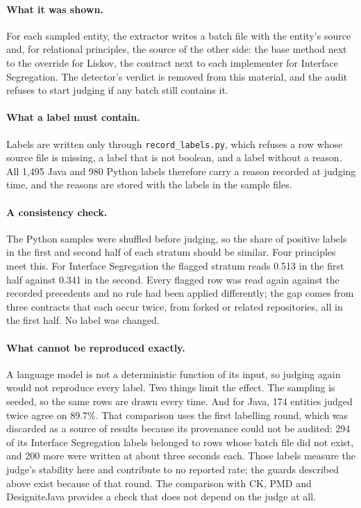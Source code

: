 \paragraph{What it was shown.} For each sampled entity, the extractor writes a batch file with the
entity's source and, for relational principles, the source of the other side: the base method next
to the override for Liskov, the contract next to each implementer for Interface Segregation. The
detector's verdict is removed from this material, and the audit refuses to start judging if any batch
still contains it.

\paragraph{What a label must contain.} Labels are written only through \texttt{record\_labels.py},
which refuses a row whose source file is missing, a label that is not boolean, and a label without a
reason. All 1{,}495 Java and 980 Python labels therefore carry a reason recorded at judging time, and
the reasons are stored with the labels in the sample files.

\paragraph{A consistency check.} The Python samples were shuffled before judging, so the share of
positive labels in the first and second half of each stratum should be similar. Four principles meet
this. For Interface Segregation the flagged stratum reads 0.513 in the first half against 0.341 in the
second. Every flagged row was read again against the recorded precedents and no rule had been applied
differently; the gap comes from three contracts that each occur twice, from forked or related
repositories, all in the first half. No label was changed.

\paragraph{What cannot be reproduced exactly.} A language model is not a deterministic function of
its input, so judging again would not reproduce every label. Two things limit the effect. The
sampling is seeded, so the same rows are drawn every time. And for Java, 174 entities judged twice
agree on 89.7\%. That comparison uses
the first labelling round, which was discarded as a source of results because its provenance could
not be audited: 294 of its Interface Segregation labels belonged to rows whose batch file did not
exist, and 200 more were written at about three seconds each. Those labels measure the judge's
stability here and contribute to no reported rate; the guards described above exist because of that
round. The comparison with CK, PMD and DesigniteJava provides a check that does not depend on the
judge at all.

